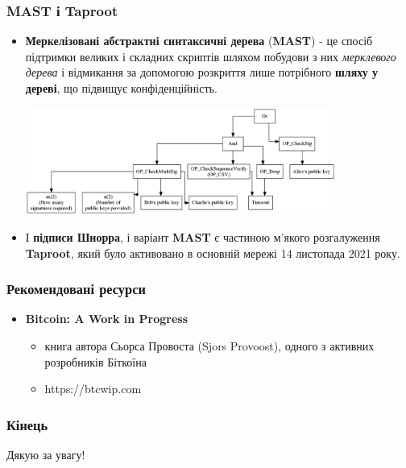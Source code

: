 \documentclass{beamer}
\begin{document}
\begin{frame}
  \frametitle{MAST і Taproot}
  \begin{itemize}
  \item \textbf{Меркелізовані абстрактні синтаксичні дерева} (\textbf{MAST}) -
    це спосіб підтримки великих і складних скриптів шляхом побудови з них
    \textit{мерклевого дерева} і відмикання за допомогою розкриття лише
    потрібного \textbf{шляху у дереві}, що підвищує конфіденційність.
    \begin{center}
      \includegraphics[width=0.8\textwidth]{mast}
    \end{center}
  \item І \textbf{підписи Шнорра}, і варіант \textbf{MAST} є частиною м’якого
    розгалуження \textbf{Taproot}, який було активовано в основній мережі 14
    листопада 2021 року.
  \end{itemize}
\end{frame}

\begin{frame}
  \frametitle{Рекомендовані ресурси}
  \begin{itemize}
  \item \textbf{Bitcoin: A Work in Progress}
    \begin{itemize}
    \item книга автора Сьорса Провоста (Sjors Provoost), одного з активних
      розробників Біткоїна
    \item https://btcwip.com
    \end{itemize}
  \end{itemize}
\end{frame}

\begin{frame}
  \frametitle{Кінець}
  \begin{center}
    Дякую за увагу!
  \end{center}
\end{frame}
\end{document}
